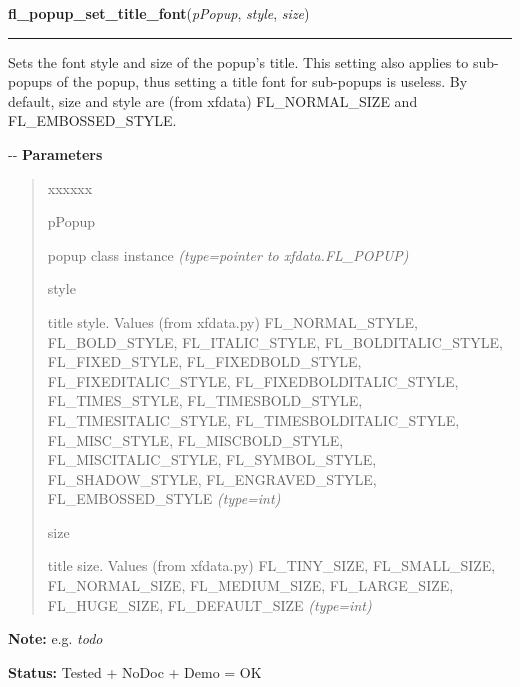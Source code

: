     \vspace{0.5ex}

\hspace{.8\funcindent}\begin{boxedminipage}{\funcwidth}

    \raggedright \textbf{fl\_popup\_set\_title\_font}(\textit{pPopup}, \textit{style}, \textit{size})

    \vspace{-1.5ex}

    \rule{\textwidth}{0.5\fboxrule}
\setlength{\parskip}{2ex}

Sets the font style and size of the popup's title. This setting also
applies to sub-popups of the popup, thus setting a title font for
sub-popups is useless. By default, size and style are (from xfdata)
FL\_NORMAL\_SIZE and FL\_EMBOSSED\_STYLE.

-{}-
\setlength{\parskip}{1ex}
      \textbf{Parameters}
      \vspace{-1ex}

      \begin{quote}
        \begin{Ventry}{xxxxxx}

          \item[pPopup]


popup class instance
            {\it (type=pointer to xfdata.FL\_POPUP)}

          \item[style]


title style. Values (from xfdata.py) FL\_NORMAL\_STYLE,
FL\_BOLD\_STYLE, FL\_ITALIC\_STYLE, FL\_BOLDITALIC\_STYLE, FL\_FIXED\_STYLE,
FL\_FIXEDBOLD\_STYLE, FL\_FIXEDITALIC\_STYLE, FL\_FIXEDBOLDITALIC\_STYLE,
FL\_TIMES\_STYLE, FL\_TIMESBOLD\_STYLE, FL\_TIMESITALIC\_STYLE,
FL\_TIMESBOLDITALIC\_STYLE, FL\_MISC\_STYLE, FL\_MISCBOLD\_STYLE,
FL\_MISCITALIC\_STYLE, FL\_SYMBOL\_STYLE, FL\_SHADOW\_STYLE,
FL\_ENGRAVED\_STYLE, FL\_EMBOSSED\_STYLE
            {\it (type=int)}

          \item[size]


title size. Values (from xfdata.py) FL\_TINY\_SIZE, FL\_SMALL\_SIZE,
FL\_NORMAL\_SIZE, FL\_MEDIUM\_SIZE, FL\_LARGE\_SIZE, FL\_HUGE\_SIZE,
FL\_DEFAULT\_SIZE
            {\it (type=int)}

        \end{Ventry}

      \end{quote}

\textbf{Note:} 
e.g. \emph{todo}


\textbf{Status:} 
Tested + NoDoc + Demo = OK


    \end{boxedminipage}

